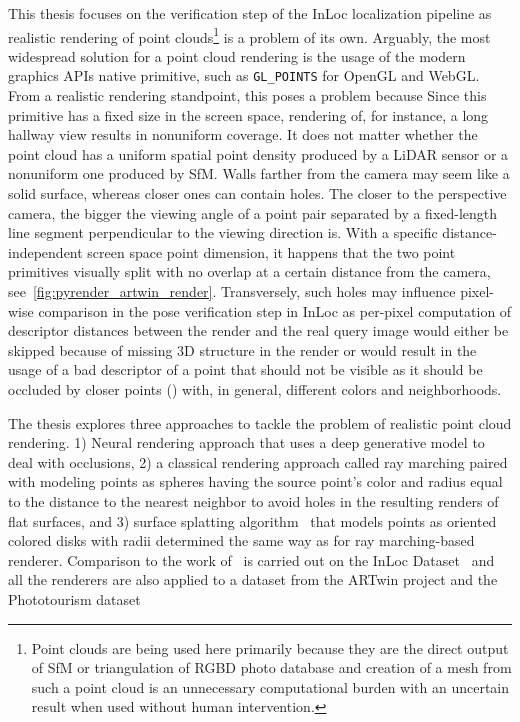 This thesis focuses on the verification step of the InLoc localization pipeline
as realistic rendering of point clouds\footnote{Point clouds are being used here
primarily because they are the direct output of SfM or triangulation of RGBD photo database and creation of
a mesh from such a point cloud is an unnecessary computational burden with an uncertain result when used
without human intervention.}
is a problem of its own. Arguably, the most widespread solution
for a point cloud rendering is the usage of the modern graphics APIs native primitive, such as \verb|GL_POINTS|
for OpenGL and WebGL. From a realistic rendering standpoint, this poses a problem because  Since this primitive has a fixed
size in the screen space, rendering of, for instance, a long hallway view results in nonuniform
 coverage. It does not matter whether the point cloud has a uniform spatial point
density produced by a LiDAR sensor or a nonuniform one produced by SfM. Walls farther from the camera may seem
like a solid surface, whereas closer ones can contain holes. The closer to the perspective camera, the bigger the
viewing angle of a point pair separated by a fixed-length line segment perpendicular to the viewing direction
is. With a specific distance-independent
screen space point dimension, it happens that the two point primitives visually split with no overlap
at a certain distance from the camera, see~\cref{fig:pyrender_artwin_render}. Transversely, such holes
may influence pixel-wise comparison in the pose verification step in InLoc as per-pixel computation of
descriptor distances between the render and the real query image would either be skipped because of missing
3D structure in the render or would result in the usage of a bad descriptor of a point that should not be visible
as it should be occluded by closer points () with, in general, different colors and neighborhoods.

The thesis explores three approaches to tackle the problem of realistic point cloud rendering. 1) Neural rendering
approach that uses a deep generative model to deal with occlusions, 2) a classical rendering approach
called ray marching paired with modeling points as spheres having the source point's color and radius equal
to the distance to the nearest neighbor to avoid holes in the resulting renders of flat surfaces, and 3)
surface splatting algorithm~\citep{SurfaceSplatting} that models points as oriented colored disks with radii determined the same
way as for ray marching-based renderer. Comparison to the work of~\citet{Bastien} is carried out on
the InLoc Dataset~\citep{InLoc} and all the renderers are also applied to a dataset from the ARTwin
project and the Phototourism
dataset
